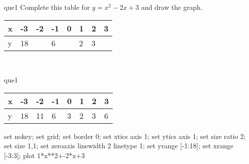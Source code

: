 \documentclass[13.5pt, varwidth=true]{beamer}
\begin{document}
\begin{frame}[shrink=19,fragile]
	\begin{beamercolorbox}[rounded=true, left, shadow=true,wd=14.8cm]{que1}
		 Complete this table for $y = x^{2} - 2x + 3$ and draw the graph. \\[0.3cm] \renewcommand{\arraystretch}{1.2}\begin{tabular}{|C|C|C|C|C|C|C|C|} \hline x & -3 & -2 & -1 & 0 & 1 & 2 & 3 \\ \hline y & 18 &  & 6 &  & 2 & 3 & \\ \hline \end{tabular}\\[0.3cm]
	\end{beamercolorbox}
\end{frame}
\begin{frame}[shrink=19,fragile]
	\begin{beamercolorbox}[rounded=true, left, shadow=true,wd=14.8cm]{que1}
		\renewcommand{\arraystretch}{1.2}\begin{tabular}{|C|C|C|C|C|C|C|C|} \hline x & -3 & -2 & -1 & 0 & 1 & 2 & 3 \\ \hline y & 18 & 11 & 6 & 3 & 2 & 3 & 6\\ \hline \end{tabular}\begin{gnuplot}[terminal=pdf] set nokey; set grid; set border 0; set xtics axis 1; set ytics axis 1; set size ratio 2; set size 1,1; set zeroaxis linewidth 2 linetype 1; set yrange [-1:18]; set xrange [-3:3]; plot 1*x**2+-2*x+3 \end{gnuplot}
	\end{beamercolorbox}
\end{frame}
\end{document}
